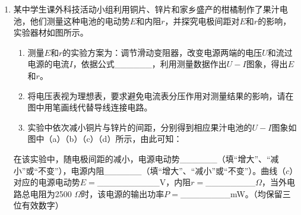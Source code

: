 \documentclass[\gkver]{gaokaozhenti}
\begin{document}
\begin{enumerate}
在用插针法测定玻璃砖折射率的实验中，两位同学绘出的玻璃砖和三个针孔 a、b、c 的位置相同，且插在 c 位置的针正好挡住插在 a、b 位置的针的像，但最后一个针孔的位置不同，分别为 d、e 两点，如图所示，计算折射率时，用\_\_\_\_\_\_\_\_（填“d”或“e”）得到的值较小，用\_\_\_\_\_\_\_\_（填“d”或“e”）点得到的值误差较小。
{figs/22b.png}

\item
某中学生课外科技活动小组利用铜片、锌片和家乡盛产的柑橘制作了果汁电池，他们测量这种电池的电动势$E$和内阻$r$，并探究电极间距对$E$和$r$的影响，实验器材如图所示。
\begin{enumerate}
	\item
	测量$E$和$r$的实验方案为：调节滑动变阻器，改变电源两端的电压$U$和流过电源的电流$I$，依据公式\_\_\_\_\_\_，利用测量数据作出$U-I$图象，得出$E$和$r$。
	\item
	将电压表视为理想表，要求避免电流表分压作用对测量结果的影响，请在图中用笔画线代替导线连接电路。
	\item
	实验中依次减小铜片与锌片的间距，分别得到相应果汁电池的$U-I$图象如图中（a）（b）（c）（d）所示，由此可知：
\end{enumerate}
在该实验中，随电极间距的减小，电源电动势\_\_\_\_\_\_（填“增大”、“减小”或“不变”），电源内阻\_\_\_\_\_\_（填“增大”、“减小”或“不变”）。曲线（$c$）对应的电源电动势$E=$\_\_\_\_\_\_\_\_\_\_V，内阻$r=$\_\_\_\_\_\_\_\_$\Omega$，当外电路总电阻为2500 $\Omega$时，该电源的输出功率$P=$\_\_\_\_\_\_\_\_mW。（均保留三位有效数字）
\end{enumerate}
\end{document}

